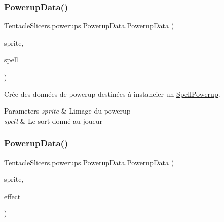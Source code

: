 \subsubsection{\texorpdfstring{Powerup\+Data()}{PowerupData()}\hspace{0.1cm}{\footnotesize\ttfamily [1/2]}}
{\footnotesize\ttfamily Tentacle\+Slicers.\+powerups.\+Powerup\+Data.\+Powerup\+Data (\begin{DoxyParamCaption}\item[{\hyperlink{class_tentacle_slicers_1_1graphics_1_1_custom_sprite}{Custom\+Sprite}}]{sprite,  }\item[{\hyperlink{class_tentacle_slicers_1_1spells_1_1_spell_data}{Spell\+Data}}]{spell }\end{DoxyParamCaption})}



Crée des données de powerup destinées à instancier un \hyperlink{class_tentacle_slicers_1_1powerups_1_1_spell_powerup}{Spell\+Powerup}. 


\begin{DoxyParams}{Parameters}
{\em sprite} & L\textquotesingle{}image du powerup \\
\hline
{\em spell} & Le sort donné au joueur \\
\hline
\end{DoxyParams}
\mbox{\label{class_tentacle_slicers_1_1powerups_1_1_powerup_data_a4af3363db0640e2359c2b365e11f762a}} 
\subsubsection{\texorpdfstring{Powerup\+Data()}{PowerupData()}\hspace{0.1cm}{\footnotesize\ttfamily [2/2]}}
{\footnotesize\ttfamily Tentacle\+Slicers.\+powerups.\+Powerup\+Data.\+Powerup\+Data (\begin{DoxyParamCaption}\item[{\hyperlink{class_tentacle_slicers_1_1graphics_1_1_custom_sprite}{Custom\+Sprite}}]{sprite,  }\item[{Action$<$ \hyperlink{class_tentacle_slicers_1_1actors_1_1_player_character}{Player\+Character} $>$}]{effect }\end{DoxyParamCaption})}



